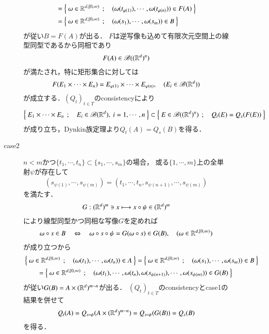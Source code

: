 \begin{prf}
\begin{description}
\begin{description}
\begin{align}
							&= \left\{\ \omega \in \mathbb{R}^{d,[0,\infty)}\ \, ; \quad (\omega(t_{\varphi(1)}),\cdots,\omega(t_{\varphi(n)})) \in F(A)\ \right\} \\
							&= \left\{\ \omega \in \mathbb{R}^{d,[0,\infty)}\ \, ; \quad (\omega(s_1),\cdots,\omega(s_m)) \in B\ \right\} 
						\end{align}
						が従い$B = F(A)$が出る．
						$F$は逆写像も込めて有限次元空間上の線型同型であるから同相であり
						\begin{align}
							F(A) \in \mathscr{B}((\mathbb{R}^d)^n)
						\end{align}
						が満たされ，特に矩形集合に対しては
						\begin{align}
							F(E_1 \times \cdots \times E_n) = E_{\varphi(1)} \times \cdots \times  E_{\varphi(n)},
							\quad (E_i \in \mathscr{B}(\mathbb{R}^d))
						\end{align}
						が成立する．$(Q_t)_{t \in T}$のconsistencyにより
						\begin{align}
							\left\{\ E_1 \times \cdots \times E_n\ \, ; \quad E_i \in \mathscr{B}(\mathbb{R}^d),\ i=1,\cdots,n\ \right\}
							\subset \left\{\ E \in \mathscr{B}((\mathbb{R}^d)^n)\ \, ; \quad Q_t(E) = Q_s(F(E))\ \right\}
						\end{align}
						が成り立ち，Dynkin族定理より$Q_t(A) = Q_s (B)$を得る．
					
					\item[case2]
						$n < m$かつ$\{t_1,\cdots,t_n\} \subset \{s_1,\cdots,s_m\}$の場合，
						或る$\{1,\cdots,m\}$上の全単射$\psi$が存在して
						\begin{align}
							(s_{\psi(1)},\cdots, s_{\psi(m)})
							= (t_1, \cdots, t_n,s_{\psi(n+1)},\cdots,s_{\psi(m)})
						\end{align}
						を満たす．
						\begin{align}
							G:(\mathbb{R}^d)^m \ni x \longmapsto x \circ \psi \in (\mathbb{R}^d)^m
						\end{align}
						により線型同型かつ同相な写像$G$を定めれば
						\begin{align}
							\omega \circ s \in B
							\quad \Leftrightarrow \quad \omega \circ s \circ \psi 
							= G(\omega \circ s) \in G(B),
							\quad (\omega \in \mathbb{R}^{d,[0,\infty)})
						\end{align}
						が成り立つから
						\begin{align}
							&\left\{\ \omega \in \mathbb{R}^{d,[0,\infty)}\ \, ; \quad (\omega(t_1),\cdots,\omega(t_n)) \in A\ \right\}
							= \left\{\ \omega \in \mathbb{R}^{d,[0,\infty)}\ \, ; \quad (\omega(s_1),\cdots,\omega(s_m)) \in B\ \right\} \\
							&\qquad= \left\{\ \omega \in \mathbb{R}^{d,[0,\infty)}\ \, ; \quad (\omega(t_1),\cdots,\omega(t_n),\omega(s_{\psi(n+1)}),\cdots,\omega(s_{\psi(m)})) \in G(B)\ \right\} 
						\end{align}
						が従い$G(B) = A \times (\mathbb{R}^d)^{m-n}$が出る．
						$(Q_t)_{t \in T}$のconsistencyとcase1の結果を併せて
						\begin{align}
							Q_t(A) = Q_{s \circ \psi}(A \times (\mathbb{R}^d)^{m-n}) = Q_{s \circ \psi}(G(B))
							= Q_s(B)
						\end{align}
						を得る．
						

\end{description}
\end{description}
\end{prf}
